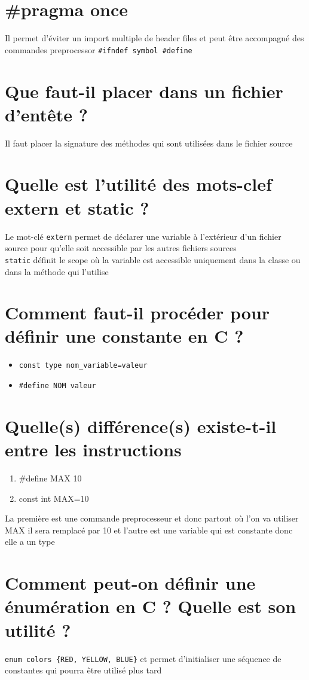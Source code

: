 \section{\#pragma once}
Il permet d'éviter un import multiple de header files et peut être accompagné des commandes preprocessor \texttt{\#ifndef symbol \#define}


\section{Que faut-il placer dans un fichier d'entête ?}
Il faut placer la signature des méthodes qui sont utilisées dans le fichier source

\section{Quelle est l'utilité des mots-clef extern et static ?}
Le mot-clé \texttt{extern} permet de déclarer une variable à l'extérieur d'un fichier source pour qu'elle soit accessible par les autres fichiers sources\\
\texttt{static} définit le scope où la variable est accessible uniquement dans la classe ou dans la méthode qui l'utilise

\section{Comment faut-il procéder pour définir une constante en C ?}
\begin{itemize}
   \item \texttt{const type nom\_variable=valeur}
   \item \texttt{\#define NOM valeur}
\end{itemize}

\section{Quelle(s) différence(s) existe-t-il entre les instructions}
\begin{enumerate}
   \item   \#define MAX 10
   \item const int MAX=10
\end{enumerate}
La première est une commande preprocesseur et donc partout où l'on va utiliser MAX il sera remplacé par 10 et l'autre est une variable qui est constante donc elle a un type 


\section{Comment peut-on définir une énumération en C ? Quelle est son utilité ?}
\texttt{enum colors \{RED, YELLOW, BLUE\}} et permet d'initialiser une séquence de constantes qui pourra être utilisé plus tard

